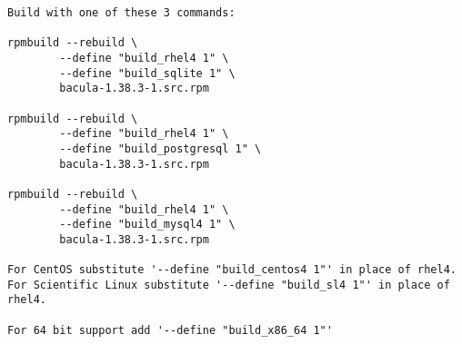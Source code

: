 \footnotesize
\begin{verbatim}
Build with one of these 3 commands:

rpmbuild --rebuild \
        --define "build_rhel4 1" \
        --define "build_sqlite 1" \
        bacula-1.38.3-1.src.rpm

rpmbuild --rebuild \
        --define "build_rhel4 1" \
        --define "build_postgresql 1" \
        bacula-1.38.3-1.src.rpm

rpmbuild --rebuild \
        --define "build_rhel4 1" \
        --define "build_mysql4 1" \
        bacula-1.38.3-1.src.rpm

For CentOS substitute '--define "build_centos4 1"' in place of rhel4. 
For Scientific Linux substitute '--define "build_sl4 1"' in place of rhel4.

For 64 bit support add '--define "build_x86_64 1"'
\end{verbatim}
\normalsize

